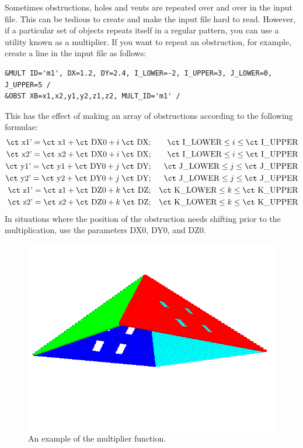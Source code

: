 \documentclass[11pt]{book}
\begin{document}
Sometimes obstructions, holes and vents are repeated over and over in the input file. This can be tedious to create and make the input file hard to read. However, if a particular set of objects repeats itself in a regular pattern, you can use a utility known as a multiplier. If you want to repeat an obstruction, for example, create a line in the input file as follows:
 \begin{lstlisting}
&MULT ID='m1', DX=1.2, DY=2.4, I_LOWER=-2, I_UPPER=3, J_LOWER=0, J_UPPER=5 /
&OBST XB=x1,x2,y1,y2,z1,z2, MULT_ID='m1' /
\end{lstlisting}
This has the effect of making an array of obstructions according to the following formulae:
\begin{eqnarray*}  \hbox{\ct x1'} = \hbox{\ct x1} + \hbox{\ct DX0} + i \; \hbox{\ct DX}  &;& \hbox{\ct I\_LOWER} \le i \le \hbox{\ct I\_UPPER} \\
                   \hbox{\ct x2'} = \hbox{\ct x2} + \hbox{\ct DX0} + i \; \hbox{\ct DX}  &;& \hbox{\ct I\_LOWER} \le i \le \hbox{\ct I\_UPPER} \\
                   \hbox{\ct y1'} = \hbox{\ct y1} + \hbox{\ct DY0} + j \; \hbox{\ct DY}  &;& \hbox{\ct J\_LOWER} \le j \le \hbox{\ct J\_UPPER} \\
                   \hbox{\ct y2'} = \hbox{\ct y2} + \hbox{\ct DY0} + j \; \hbox{\ct DY}  &;& \hbox{\ct J\_LOWER} \le j \le \hbox{\ct J\_UPPER} \\
                   \hbox{\ct z1'} = \hbox{\ct z1} + \hbox{\ct DZ0} + k \; \hbox{\ct DZ}  &;& \hbox{\ct K\_LOWER} \le k \le \hbox{\ct K\_UPPER} \\
                   \hbox{\ct z2'} = \hbox{\ct z2} + \hbox{\ct DZ0} + k \; \hbox{\ct DZ}  &;& \hbox{\ct K\_LOWER} \le k \le \hbox{\ct K\_UPPER}
\end{eqnarray*}
In situations where the position of the obstruction needs shifting prior to the multiplication, use the parameters {\ct DX0}, {\ct DY0}, and {\ct DZ0}.

\begin{figure}[t]
\includegraphics[width=\textwidth]{SCRIPT_FIGURES/pyramid}
\caption[An example of the multiplier function]{An example of the multiplier function.}
\label{fig:mult}
\end{figure}
\end{document}
